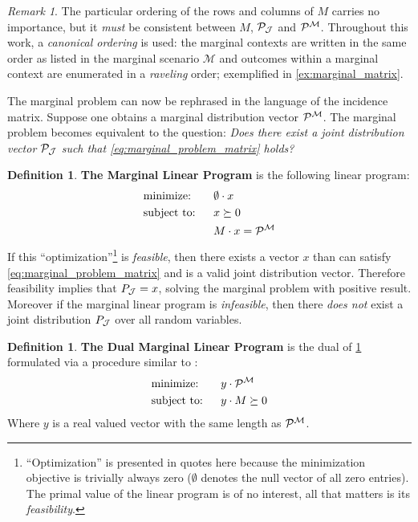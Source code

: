 \documentclass[aps, 10pt, english, twoside, pra, nofootinbib, longbibliography]{revtex4-1}
\theoremstyle{plain}
\theoremstyle{definition}
\newtheorem{definition}[theorem]{Definition}
\theoremstyle{remark}
\newtheorem{remark}[theorem]{Remark}
\newcommand{\mscenario}{\mathcal{M}}
\newcommand{\jointvar}{\mathcal{J}}
\newcommand{\term}[1]{\textcolor{Mahogany}{\textbf{#1}}}
\begin{document}
    \begin{remark}
        The particular ordering of the rows and columns of $M$ carries no importance, but it \textit{must} be consistent between $M$, $\probvec[\jointvar]$ and $\probvec^{\mscenario}$. Throughout this work, a \textit{canonical ordering} is used: the marginal contexts are written in the same order as listed in the marginal scenario $\mscenario$ and outcomes within a marginal context are enumerated in a \textit{raveling} order; exemplified in \cref{ex:marginal_matrix}.
    \end{remark}

    The marginal problem can now be rephrased in the language of the incidence matrix. Suppose one obtains a marginal distribution vector $\probvec^{\mscenario}$. The marginal problem becomes equivalent to the question: \textit{Does there exist a joint distribution vector $\probvec[\jointvar]$ such that \cref{eq:marginal_problem_matrix} holds?}

    \begin{definition}
        \label{def:marginal_linear_program}
        \term{The Marginal Linear Program} is the following linear program:
        \begin{alignat*}{2}
            & \text{minimize:} \quad&& \emptyset \cdot x\\
            & \text{subject to:} && x \succeq 0 \\
            & && M \cdot x = \probvec^{\mscenario}
        \end{alignat*}
        If this ``optimization''\footnote{``Optimization'' is presented in quotes here because the minimization objective is trivially always zero ($\emptyset$ denotes the null vector of all zero entries). The primal value of the linear program is of no interest, all that matters is its \textit{feasibility}.} is \textit{feasible}, then there exists a vector $x$ than can satisfy \cref{eq:marginal_problem_matrix} and is a valid joint distribution vector. Therefore feasibility implies that $\prob[\jointvar] = x$, solving the marginal problem with positive result. Moreover if the marginal linear program is \textit{infeasible}, then there \textit{does not} exist a joint distribution $\prob[\jointvar]$ over all random variables.
    \end{definition}
    \begin{definition}
        \label{def:dual_marginal_linear_program}
        \term{The Dual Marginal Linear Program} is the dual of \cref{def:marginal_linear_program} formulated via a procedure similar to \cite{Lahaie_2008}:
        \begin{alignat*}{2}
            & \text{minimize:} \quad&& y \cdot \probvec^{\mscenario}\\
            & \text{subject to:} && y \cdot M \succeq 0
        \end{alignat*}
        Where $y$ is a real valued vector with the same length as $\probvec^{\mscenario}$.
    \end{definition}
\end{document}
